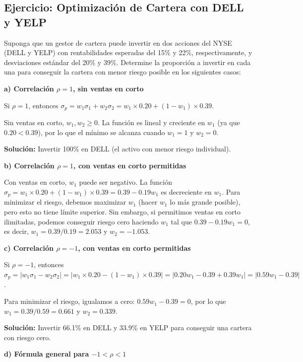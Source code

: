 \subsection{Ejercicio: Optimización de Cartera con DELL y YELP}

\begin{ejemplo}
Suponga que un gestor de cartera puede invertir en dos acciones del NYSE (DELL y YELP) con rentabilidades esperadas del 15\% y 22\%, respectivamente, y desviaciones estándar del 20\% y 39\%. Determine la proporción a invertir en cada una para conseguir la cartera con menor riesgo posible en los siguientes casos:

\textbf{a) Correlación $\rho = 1$, sin ventas en corto}

Si $\rho = 1$, entonces $\sigma_p = w_1 \sigma_1 + w_2 \sigma_2 = w_1 \times 0.20 + (1-w_1) \times 0.39$.

Sin ventas en corto, $w_1, w_2 \geq 0$. La función es lineal y creciente en $w_1$ (ya que $0.20 < 0.39$), por lo que el mínimo se alcanza cuando $w_1 = 1$ y $w_2 = 0$.

\textbf{Solución:} Invertir 100\% en DELL (el activo con menor riesgo individual).

\textbf{b) Correlación $\rho = 1$, con ventas en corto permitidas}

Con ventas en corto, $w_1$ puede ser negativo. La función $\sigma_p = w_1 \times 0.20 + (1-w_1) \times 0.39 = 0.39 - 0.19w_1$ es decreciente en $w_1$. Para minimizar el riesgo, debemos maximizar $w_1$ (hacer $w_1$ lo más grande posible), pero esto no tiene límite superior. Sin embargo, si permitimos ventas en corto ilimitadas, podemos conseguir riesgo cero haciendo $w_1$ tal que $0.39 - 0.19w_1 = 0$, es decir, $w_1 = 0.39/0.19 = 2.053$ y $w_2 = -1.053$.

\textbf{c) Correlación $\rho = -1$, con ventas en corto permitidas}

Si $\rho = -1$, entonces $\sigma_p = |w_1 \sigma_1 - w_2 \sigma_2| = |w_1 \times 0.20 - (1-w_1) \times 0.39| = |0.20w_1 - 0.39 + 0.39w_1| = |0.59w_1 - 0.39|$.

Para minimizar el riesgo, igualamos a cero: $0.59w_1 - 0.39 = 0$, por lo que $w_1 = 0.39/0.59 = 0.661$ y $w_2 = 0.339$.

\textbf{Solución:} Invertir 66.1\% en DELL y 33.9\% en YELP para conseguir una cartera con riesgo cero.

\textbf{d) Fórmula general para $-1 < \rho < 1$}


\end{ejemplo}
